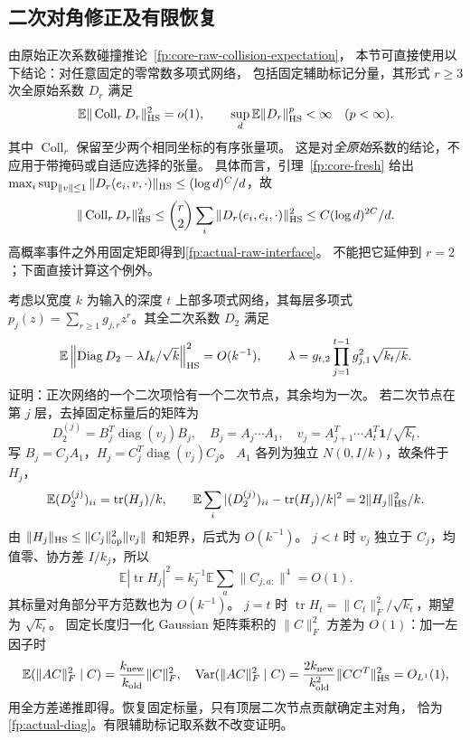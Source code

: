 \documentclass[a4paper]{tufte-handout}
\begin{document}
\begin{fullwidth}
\subsection{二次对角修正及有限恢复}
\label{fp:actual-quadratic}
由原始正次系数碰撞推论~\ref{fp:core-raw-collision-expectation}，
本节可直接使用以下结论：对任意固定的零常数多项式网络，
包括固定辅助标记分量，其形式 $r\geq3$ 次全原始系数 $D_r$ 满足
\begin{equation}\label{fp:actual-raw-interface}
 \mathbb E\|\operatorname{Coll}_rD_r\|_{\rm HS}^2=o(1),
 \qquad \sup_d\mathbb E\|D_r\|_{\rm HS}^p<\infty\quad(p<\infty).
\end{equation}
其中 $\operatorname{Coll}_r$ 保留至少两个相同坐标的有序张量项。
这是对\emph{全原始}系数的结论，不应用于带掩码或自适应选择的张量。
具体而言，引理~\ref{fp:core-fresh} 给出
$\max_i\sup_{\|v\|\leq1}\|D_r(e_i,v,\cdot)\|_{\rm HS}
\leq (\log d)^C/d$，故
\[
 \|\operatorname{Coll}_rD_r\|_{\rm HS}^2
 \leq {r\choose2}\sum_i\|D_r(e_i,e_i,\cdot)\|_{\rm HS}^2
 \leq C(\log d)^{2C}/d.
\]
高概率事件之外用固定矩即得到\eqref{fp:actual-raw-interface}。
不能把它延伸到 $r=2$；下面直接计算这个例外。

考虑以宽度 $k$ 为输入的深度 $t$ 上部多项式网络，其每层多项式
$p_j(z)=\sum_{r\geq1}g_{j,r}z^r$。其全二次系数 $D_2$ 满足
\begin{equation}\label{fp:actual-diag}
 \mathbb E\left\|\operatorname{Diag}D_2-
 \lambda I_k/\sqrt k\right\|_{\rm HS}^2=O(k^{-1}),\qquad
 \lambda=g_{t,2}\prod_{j=1}^{t-1}g_{j,1}^{2}\sqrt{k_t/k}.
\end{equation}
证明：正次网络的一个二次项恰有一个二次节点，其余均为一次。
若二次节点在第 $j$ 层，去掉固定标量后的矩阵为
\[
 D_2^{(j)}=B_j^T\operatorname{diag}(v_j)B_j,\quad
 B_j=A_j\cdots A_1,\quad v_j=A_{j+1}^T\cdots A_t^T\mathbf1/\sqrt{k_t}.
\]
写 $B_j=C_jA_1$，$H_j=C_j^T\operatorname{diag}(v_j)C_j$。
$A_1$ 各列为独立 $N(0,I/k)$，故条件于 $H_j$，
\begin{equation}\label{fp:actual-diag-gauss}
 \mathbb E(D_2^{(j)})_{ii}=\operatorname{tr}(H_j)/k,
 \qquad \mathbb E\sum_i|(D_2^{(j)})_{ii}-\operatorname{tr}(H_j)/k|^2
 =2\|H_j\|_{\rm HS}^2/k.
\end{equation}
由 $\|H_j\|_{\rm HS}\leq\|C_j\|_{\rm op}^2\|v_j\|$ 和矩界，后式为 $O(k^{-1})$。
$j<t$ 时 $v_j$ 独立于 $C_j$，均值零、协方差 $I/k_j$，所以
\[
 \mathbb E|\operatorname{tr}H_j|^2
 =k_j^{-1}\mathbb E\sum_a\|C_{j,a:}\|^4=O(1).
\]
其标量对角部分平方范数也为 $O(k^{-1})$。
$j=t$ 时 $\operatorname{tr}H_t=\|C_t\|_F^2/\sqrt{k_t}$，期望为 $\sqrt{k_t}$。
固定长度归一化 Gaussian 矩阵乘积的 $\|C\|_F^2$ 方差为 $O(1)$：加一左因子时
\[
 \mathbb E(\|AC\|_F^2\mid C)=\frac{k_{\rm new}}{k_{\rm old}}\|C\|_F^2,
 \quad \operatorname{Var}(\|AC\|_F^2\mid C)
 =\frac{2k_{\rm new}}{k_{\rm old}^2}\|CC^T\|_{\rm HS}^2=O_{L^1}(1),
\]
用全方差递推即得。恢复固定标量，只有顶层二次节点贡献确定主对角，
恰为\eqref{fp:actual-diag}。有限辅助标记取系数不改变证明。


\end{fullwidth}
\end{document}
